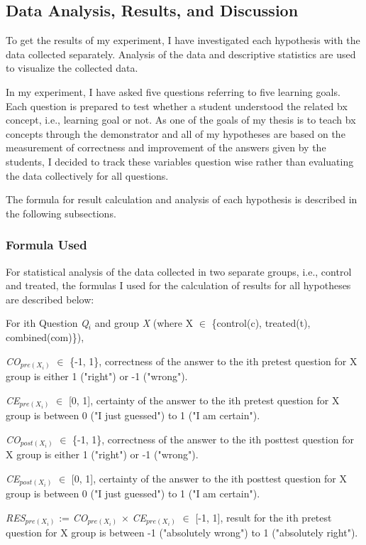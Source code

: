 \subsection{Data Analysis, Results, and Discussion}\label{subsec:results}
To get the results of my experiment, I have investigated each hypothesis with the data collected separately. Analysis of the data and descriptive statistics are used to visualize the collected data. 

In my experiment, I have asked five questions referring to five learning goals. Each question is prepared to test whether a student understood the related bx concept, i.e., learning goal or not. As one of the goals of my thesis is to teach bx concepts through the demonstrator and all of my hypotheses are based on the measurement of correctness and improvement of the answers given by the students, I decided to track these variables question wise rather than evaluating the data collectively for all questions.

The formula for result calculation and analysis of each hypothesis is described in the following subsections.

\subsubsection{Formula Used}\label{subsubsec:evaluation_formula}
For statistical analysis of the data collected in two separate groups, i.e., control and treated, the formulas I used for the calculation of results for all hypotheses are described below:

For ith Question \textit{Q$_{i}$} and group \textit{X} (where X $\in$ \{control(c), treated(t), combined(com)\}),

\textit{CO$_{pre(X_i)}$} $\in$ \{-1, 1\}, correctness of the answer to the ith pretest question for X group is either 1 ("right") or -1 ("wrong").

\textit{CE$_{pre(X_i)}$} $\in$ [0, 1], certainty of the answer to the ith pretest question for X group is between 0 ("I just guessed") to 1 ("I am certain").

\textit{CO$_{post(X_i)}$} $\in$ \{-1, 1\}, correctness of the answer to the ith posttest question for X group is either 1 ("right") or -1  ("wrong").

\textit{CE$_{post(X_i)}$} $\in$ [0, 1], certainty of the answer to the ith posttest question for X group is between 0 ("I just guessed") to 1 ("I am certain").

\textit{RES$_{pre(X_i)}$} := \textit{CO$_{pre(X_i)}$} $\times$ \textit{CE$_{pre(X_i)}$} $\in$ [-1,  1], result for the ith pretest question for X group is between -1 ("absolutely wrong") to 1 ("absolutely right").


